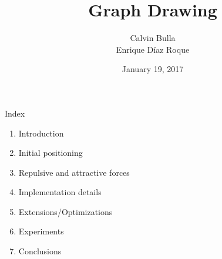 \documentclass{beamer}
\title{Graph Drawing}
\date{January 19, 2017}
\author{Calvin Bulla \\ Enrique Díaz Roque}
\institute{Algorithms for VLSI}
\begin{document}
\maketitle


\begin{frame}{Index}
\begin{enumerate}
\item Introduction
\item Initial positioning
\item Repulsive and attractive forces
\item Implementation details
\item Extensions/Optimizations
\item Experiments
\item Conclusions
\end{enumerate}
\end{frame}
\end{document}
